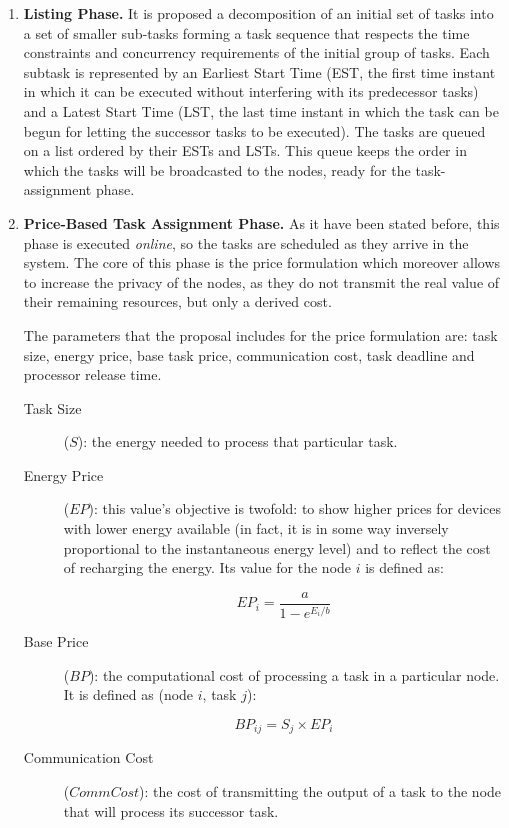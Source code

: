 \begin{enumerate}
\item \textbf{Listing Phase. } It is proposed a decomposition of an initial set of tasks into a set of smaller sub-tasks forming a task sequence that respects the time constraints and concurrency requirements of the initial group of tasks. Each subtask is represented by an Earliest Start Time (EST, the first time instant in which it can be executed without interfering with its predecessor tasks) and a Latest Start Time (LST, the last time instant in which the task can be begun for letting the successor tasks to be executed). The tasks are queued on a list ordered by their ESTs and LSTs. This queue keeps the order in which the tasks will be broadcasted to the nodes, ready for the task-assignment phase.
\item \textbf{Price-Based Task Assignment Phase. } As it have been stated before, this phase is executed \emph{online}, so the tasks are scheduled  as they arrive in the system. The core of this phase is the price formulation which moreover allows to increase the privacy of the nodes, as they do not transmit the real value of their remaining resources, but only a derived cost.

The parameters that the proposal includes for the price formulation are: task size, energy price, base task price, communication cost, task deadline and processor release time.
\begin{description}
\item[Task Size] ($ S $): the energy needed to process that particular task.
\item[Energy Price] ($ EP $): this value's objective is twofold: to show higher prices for devices with lower energy available (in fact, it is in some way inversely proportional to the instantaneous energy level) and to reflect the cost of recharging the energy. Its value for the node $i$ is defined as:

\begin{equation}
EP_i = \frac{a}{1-e^{E_i/b}}
\end{equation}
 
\item[Base Price] ($ BP $): the computational cost of processing a task in a particular node. It is defined as (node $i$, task $j$):

\begin{equation}
BP_{ij} = S_j \times EP_i
\end{equation}

\item[Communication Cost] ($ CommCost $): the cost of transmitting the output of a task to the node that will process its successor task.


\end{description}
\end{enumerate}
